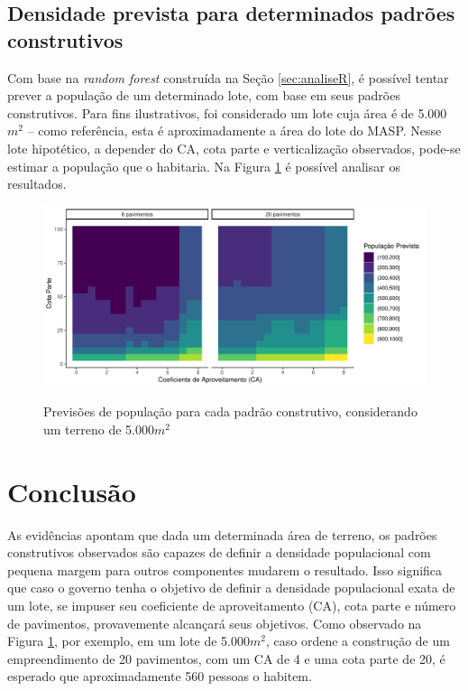 \section{Densidade prevista para determinados padrões construtivos}

Com base na \textit{random forest} construída na Seção \ref{sec:analiseR}, é possível tentar prever a população de um determinado lote, com base em seus padrões construtivos. Para fins ilustrativos, foi considerado um lote cuja área é de 5.000$m^2$ -- como referência, esta é aproximadamente a área do lote do MASP. Nesse lote hipotético, a depender do CA, cota parte e verticalização observados, pode-se estimar a população que o habitaria. Na Figura \ref{fig:previsoes} é possível analisar os resultados.


\begin{figure}[h]
    \centering
    \caption{Previsões de população para cada padrão construtivo, considerando um terreno de 5.000$m^2$}
    \includegraphics[width = \textwidth]{imagens/previsoes.pdf}
    \label{fig:previsoes}
\end{figure}


\chapter{Conclusão}
\label{sec:conclusao}

As evidências apontam que dada um determinada área de terreno, os padrões construtivos observados são capazes de definir a densidade populacional com pequena margem para outros componentes mudarem o resultado. Isso significa que caso o governo tenha o objetivo de definir a densidade populacional exata de um lote, se impuser seu coeficiente de aproveitamento (CA), cota parte e número de pavimentos, provavemente alcançará seus objetivos. Como observado na Figura \ref{fig:previsoes}, por exemplo, em um lote de 5.000$m^2$, caso ordene a construção de um empreendimento de 20 pavimentos, com um CA de 4 e uma cota parte de 20, é esperado que aproximadamente 560 pessoas o habitem. 

